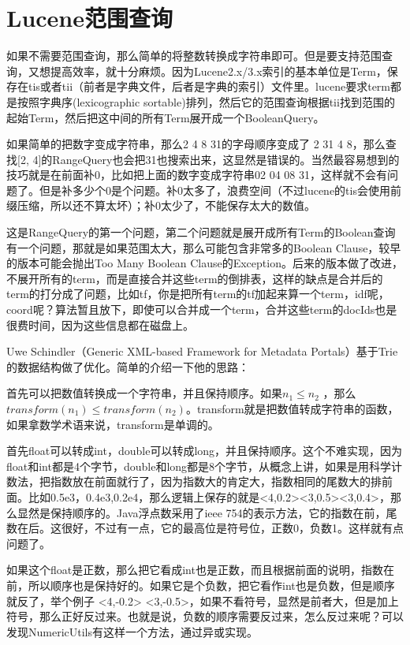 \section{Lucene范围查询}
如果不需要范围查询，那么简单的将整数转换成字符串即可。但是要支持范围查询，又想提高效率，就十分麻烦。因为Lucene2.x/3.x索引的基本单位是Term，保存在tis或者tii（前者是字典文件，后者是字典的索引）文件里。lucene要求term都是按照字典序(lexicographic sortable)排列，然后它的范围查询根据tii找到范围的起始Term，然后把这中间的所有Term展开成一个BooleanQuery。
\par 如果简单的把数字变成字符串，那么2  4  8 31的字母顺序变成了 2 31 4 8，那么查找[2, 4]的RangeQuery也会把31也搜索出来，这显然是错误的。当然最容易想到的技巧就是在前面补0，比如把上面的数字变成字符串02 04 08 31，这样就不会有问题了。但是补多少个0是个问题。补0太多了，浪费空间（不过lucene的tis会使用前缀压缩，所以还不算太坏）；补0太少了，不能保存太大的数值。
\par 这是RangeQuery的第一个问题，第二个问题就是展开成所有Term的Boolean查询有一个问题，那就是如果范围太大，那么可能包含非常多的Boolean Clause，较早的版本可能会抛出Too Many Boolean Clause的Exception。后来的版本做了改进，不展开所有的term，而是直接合并这些term的倒排表，这样的缺点是合并后的term的打分成了问题，比如tf，你是把所有term的tf加起来算一个term，idf呢，coord呢？算法暂且放下，即使可以合并成一个term，合并这些term的docIds也是很费时间，因为这些信息都在磁盘上。
\par Uwe Schindler（Generic XML-based Framework for Metadata Portals）基于Trie的数据结构做了优化。简单的介绍一下他的思路：
\par 首先可以把数值转换成一个字符串，并且保持顺序。如果$n_1 \le n_2$ ，那么$transform(n_1) \le transform(n_2)$。transform就是把数值转成字符串的函数，如果拿数学术语来说，transform是单调的。
\par 首先float可以转成int，double可以转成long，并且保持顺序。这个不难实现，因为float和int都是4个字节，double和long都是8个字节，从概念上讲，如果是用科学计数法，把指数放在前面就行了，因为指数大的肯定大，指数相同的尾数大的排前面。比如0.5e3，0.4e3,0.2e4，那么逻辑上保存的就是<4,0.2><3,0.5><3,0.4>，那么显然是保持顺序的。Java浮点数采用了ieee 754的表示方法，它的指数在前，尾数在后。这很好，不过有一点，它的最高位是符号位，正数0，负数1。这样就有点问题了。
\par 如果这个float是正数，那么把它看成int也是正数，而且根据前面的说明，指数在前，所以顺序也是保持好的。如果它是个负数，把它看作int也是负数，但是顺序就反了，举个例子 <4,-0.2> <3,-0.5>，如果不看符号，显然是前者大，但是加上符号，那么正好反过来。也就是说，负数的顺序需要反过来，怎么反过来呢？可以发现NumericUtils有这样一个方法，通过异或实现。
